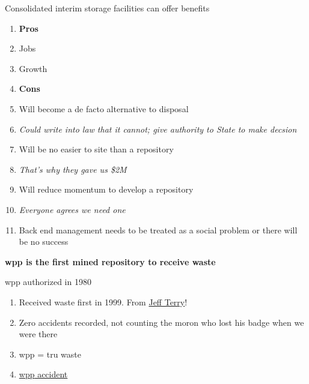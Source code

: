 \documentclass[aspectratio=1610,pdftex,dvipsnames,compress,xcolor={dvipsnames}]{beamer}
\newcommand{\acs}{\acrshort} %
\begin{document}
\begin{frame}{Consolidated interim storage facilities can offer benefits}
    \begin{enumerate}[series=outerlist,topsep=0pt,itemsep=5pt,leftmargin=*,label=(\arabic*)]
        \item[]\textbf{Pros}
        \item[]Jobs
        \item[]Growth
            \vspace{0.15in}
        \item[]\textbf{Cons}
        \item[]Will become a de facto alternative to disposal
        \item[]\textit{Could write into law that it cannot; give authority to State to make decsion}
        \item[]Will be no easier to site than a repository
        \item[]\textit{That's why they gave us \$2M}
        \item[]Will reduce momentum to develop a repository
        \item[]\textit{Everyone agrees we need one}
            \vspace{0.20in}
        \item[]Back end management needs to be treated as a social problem or there will be no success
    \end{enumerate}
\end{frame}


\begin{frame}[plain]{}
    \centering\LARGE\textbf{\acs{wpp} is the first mined repository to receive waste}
\end{frame}


\addtocounter{framenumber}{-1} 
\begin{frame}{\acs{wpp} authorized in 1980}
    \begin{enumerate}[topsep=0pt,itemsep=21pt,leftmargin=*,label=(\arabic*)]
        \item[]Received waste first in 1999. From \href{https://twitter.com/nuclear94}{Jeff Terry}!
        \item[]Zero accidents recorded, not counting the moron who lost his badge when we were there
        \item[]\acs{wpp} = \acs{tru} waste
        \item[]\href{https://uidaho.pressbooks.pub/nuclearengineering/chapter/doe-waste-disposal-facilities/}{\acs{wpp} accident}
    \end{enumerate}
\end{frame}
\end{document}
